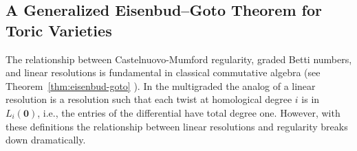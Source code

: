 \documentclass[11pt,reqno]{amsart}
\theoremstyle{remark}
\newcommand{\GL}{{GL}}
\newcommand{\zero}{\mathbf{0}}
\begin{document}

 \subsection{A Generalized Eisenbud--Goto Theorem for Toric Varieties}

The relationship between Castelnuovo-Mumford regularity, graded Betti numbers, and linear resolutions is fundamental in classical commutative algebra (see Theorem~\ref{thm:eisenbud-goto} \cite{eisenbudGoto84}). In the multigraded the analog of a linear resolution is a resolution such that each twist at homological degree $i$ is in $L_{i}(\zero)$, i.e., the entries of the differential have total degree one. However, with these definitions the relationship between linear resolutions and regularity breaks down dramatically.
\end{document}
